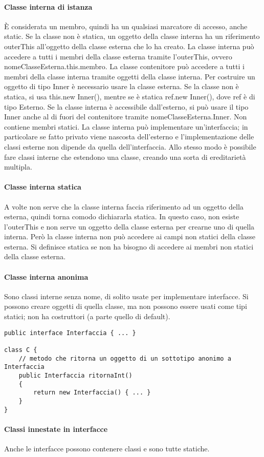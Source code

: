 \paragraph{Classe interna di istanza} È considerata un membro, quindi ha un qualsiasi marcatore di accesso, anche static. Se la classe non è statica, un oggetto della classe interna ha un riferimento outerThis all'oggetto della classe esterna che lo ha creato.
La classe interna può accedere a tutti i membri della classe esterna tramite l'outerThis, ovvero nomeClasseEsterna.this.membro.
La classe contenitore può accedere a tutti i membri della classe interna tramite oggetti della classe interna.
Per costruire un oggetto di tipo Inner è necessario usare la classe esterna. Se la classe non è statica, si usa this.new Inner(), mentre se è statica ref.new Inner(), dove ref è di tipo Esterno.
Se la classe interna è accessibile dall'esterno, si può usare il tipo Inner anche al di fuori del contenitore tramite nomeClasseEsterna.Inner. 
Non contiene membri statici.
La classe interna può implementare un'interfaccia; in particolare se fatto privato viene nascosta dell'esterno e l'implementazione delle classi esterne non dipende da quella dell'interfaccia. Allo stesso modo è possibile fare classi interne che estendono una classe, creando una sorta di ereditarietà multipla.
\paragraph{Classe interna statica}
A volte non serve che la classe interna faccia riferimento ad un oggetto della esterna, quindi torna comodo dichiararla statica. In questo caso, non esiste l'outerThis e non serve un oggetto della classe esterna per crearne uno di quella interna. Però la classe interna non può accedere ai campi non statici della classe esterna.
Si definisce statica se non ha bisogno di accedere ai membri non statici della classe esterna.
\paragraph{Classe interna anonima}
Sono classi interne senza nome, di solito usate per implementare interfacce. Si possono creare oggetti di quella classe, ma non possono essere usati come tipi statici; non ha costruttori (a parte quello di default).
\begin{lstlisting}
public interface Interfaccia { ... }

class C {
    // metodo che ritorna un oggetto di un sottotipo anonimo a Interfaccia
    public Interfaccia ritornaInt()
    {
        return new Interfaccia() { ... }
    }
}
\end{lstlisting} 
\paragraph{Classi innestate in interfacce}
Anche le interfacce possono contenere classi e sono tutte statiche.

